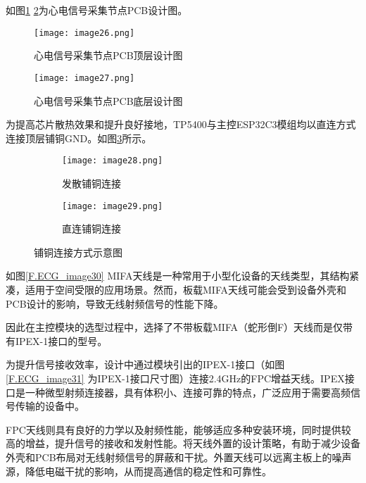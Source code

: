 如图\ref{F.ECG_image26} \ref{F.ECG_image27}为心电信号采集节点PCB设计图。

\begin{figure}[hbt]
    \centering
    \texttt{[image: image26.png]}
    \caption{心电信号采集节点PCB顶层设计图}
    \label{F.ECG_image26}
\end{figure}

\begin{figure}[hbt]
    \centering
    \texttt{[image: image27.png]}
    \caption{心电信号采集节点PCB底层设计图}
    \label{F.ECG_image27}
\end{figure}

为提高芯片散热效果和提升良好接地，TP5400与主控ESP32C3模组均以直连方式连接顶层铺铜GND。如图\ref{F.ECG_image28}所示。

\begin{figure}[!htb]
    \centering
    \begin{subfigure}[t]{0.24\linewidth}
        \begin{minipage}[b]{1\linewidth}
        \texttt{[image: image28.png]}
        \caption{发散铺铜连接}
        \end{minipage}
    \end{subfigure}
    \begin{subfigure}[t]{0.24\linewidth}
        \begin{minipage}[b]{1\linewidth}
        \texttt{[image: image29.png]}
        \caption{直连铺铜连接}
        \end{minipage}
    \end{subfigure}
    \caption{铺铜连接方式示意图}
    \label{F.ECG_image28}
\end{figure}

如图\ref{F.ECG_image30} MIFA天线是一种常用于小型化设备的天线类型，其结构紧凑，适用于空间受限的应用场景。然而，板载MIFA天线可能会受到设备外壳和PCB设计的影响，导致无线射频信号的性能下降。\cite{2.4G天线耦合强电磁脉冲特性及其防护措施的研究}

因此在主控模块的选型过程中，选择了不带板载MIFA（蛇形倒F）天线而是仅带有IPEX-1接口的型号。

为提升信号接收效率，设计中通过模块引出的IPEX-1接口（如图\ref{F.ECG_image31} 为IPEX-1接口尺寸图）连接2.4GHz的FPC增益天线。IPEX接口是一种微型射频连接器，具有体积小、连接可靠的特点，广泛应用于需要高频信号传输的设备中。

FPC天线则具有良好的力学以及射频性能，能够适应多种安装环境，同时提供较高的增益，提升信号的接收和发射性能。将天线外置的设计策略，有助于减少设备外壳和PCB布局对无线射频信号的屏蔽和干扰。外置天线可以远离主板上的噪声源，降低电磁干扰的影响，从而提高通信的稳定性和可靠性。

